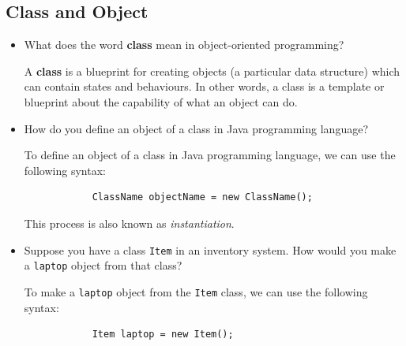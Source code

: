\documentclass[12pt,titlepage]{article}
\begin{document}
\subsection*{Class and Object}
\begin{itemize}
    \item {
        What does the word \textbf{class} mean in object-oriented programming?

        A \textbf{class} is a blueprint for creating objects (a particular data structure) which
        can contain states and behaviours. In other words, a class is a template or blueprint
        about the capability of what an object can do.
    }
    \item {
        How do you define an object of a class in Java programming language?

        To define an object of a class in Java programming language, we can use the following
        syntax:

        \begin{verbatim}
            ClassName objectName = new ClassName();
        \end{verbatim}

        This process is also known as \textit{instantiation}.
    }
    \item {
        Suppose you have a class \texttt{Item} in an inventory system. How would you make
        a \texttt{laptop} object from that class?

        To make a \texttt{laptop} object from the \texttt{Item} class, we can use the following
        syntax:

        \begin{verbatim}
            Item laptop = new Item();
        \end{verbatim}
    }
\end{itemize}
\end{document}
